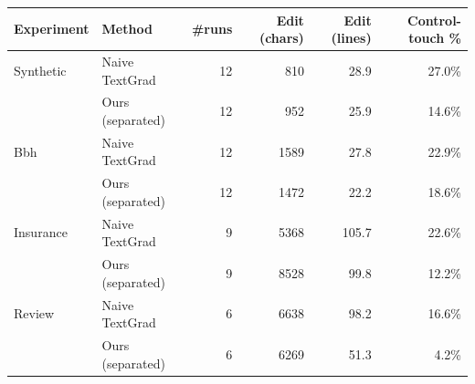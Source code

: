 \begin{tabular}{llrrrr}
\toprule
Experiment & Method & \#runs & Edit (chars) & Edit (lines) & Control-touch \% \\
\midrule
Synthetic & Naive TextGrad & 12 & 810 & 28.9 & 27.0\% \\
 & Ours (separated) & 12 & 952 & 25.9 & 14.6\% \\
\midrule
Bbh & Naive TextGrad & 12 & 1589 & 27.8 & 22.9\% \\
 & Ours (separated) & 12 & 1472 & 22.2 & 18.6\% \\
\midrule
Insurance & Naive TextGrad & 9 & 5368 & 105.7 & 22.6\% \\
 & Ours (separated) & 9 & 8528 & 99.8 & 12.2\% \\
\midrule
Review & Naive TextGrad & 6 & 6638 & 98.2 & 16.6\% \\
 & Ours (separated) & 6 & 6269 & 51.3 & 4.2\% \\
\bottomrule
\end{tabular}